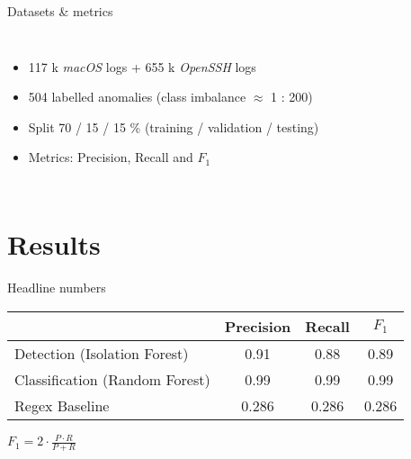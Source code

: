 \documentclass[15pt,aspectratio=169]{beamer}
\newcommand{\IForest}{Isolation Forest\xspace}
\newcommand{\RForest}{Random Forest\xspace}
\begin{document}
\begin{frame}{Datasets \& metrics}
\begin{columns}
  \begin{itemize}[<+->]
     \item 117 k \textit{macOS} logs + 655 k \textit{OpenSSH} logs
     \item 504 labelled anomalies (class imbalance $\approx$ 1 : 200)
     \item Split 70 / 15 / 15 \% (training / validation / testing)
     \item Metrics: Precision, Recall and $F_{1}$
  \end{itemize}
    \centering

\end{columns}
\end{frame}

\section{Results}


\begin{frame}{Headline numbers}
\centering
\begin{tabular}{lccc}
  \toprule
   & Precision & Recall & $F_{1}$ \\
  \midrule
  Detection (\IForest) & 0.91 & 0.88 & 0.89 \\
  Classification (\RForest) & 0.99 & 0.99 & 0.99 \\
  \midrule
  Regex Baseline & 0.286 & 0.286 & 0.286 \\
  \bottomrule
\end{tabular}

\vspace{.8em}
\small
$F_{1} = 2 \cdot \frac{P \cdot R}{P + R}$
\end{frame}
\end{document}

